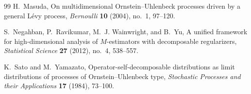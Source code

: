 \documentclass[12pt]{article}
\theoremstyle{definition}
\begin{document}
\begin{thebibliography}{99}
		H.~Masuda,
		\newblock On multidimensional Ornstein--Uhlenbeck processes driven by a general L\'evy process,
		\newblock \emph{Bernoulli} \textbf{10} (2004), no.~1, 97--120.
		
		S.~Negahban, P.~Ravikumar, M.~J. Wainwright, and B.~Yu,
		\newblock A unified framework for high-dimensional analysis of $M$-estimators with decomposable regularizers,
		\newblock \emph{Statistical Science} \textbf{27} (2012), no.~4, 538--557.
		
		K.~Sato and M.~Yamazato,
		\newblock Operator-self-decomposable distributions as limit distributions of processes of Ornstein--Uhlenbeck type,
		\newblock \emph{Stochastic Processes and their Applications} \textbf{17} (1984), 73--100.
		
	\end{thebibliography}
	
\end{document}
